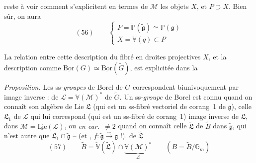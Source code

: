 \documentclass[11pt,a4paper]{article}
\begin{document}
 reste à voir comment s'explicitent en termes de $\mathcal{M}$ les
objets $X$, et $P \supset X$. Bien sûr, on aura
\[
  (56) \qquad \left\lbrace
  \begin{array}{l}
    P = \check{\mathbb{P}}(\widetilde{\mathfrak{g}}) \simeq \mathbb{P}(\mathfrak{g}) \\
    X = \mathbb{V}(q) \subset P
  \end{array}\right.
\]

La relation \struck{\ill{}} entre cette description du fibré en droites
projectives $X$, et la description comme $\underline{\mathrm{Bor}}(G) \simeq
\underline{\mathrm{Bor}}(\widetilde{G})$, est explicitée dans la

\emph{Proposition.} Les ss-\emph{groupes} de Borel  de $G$ correspondent
biunivoquement par image inverse  : 
 de $\mathcal{L} = \mathbb{V}(\mathcal{M})^{*}$ \ill{} 
de $\widetilde{G}$. Un ss-\emph{groupe} de Borel est connu quand on connaît son
algèbre de Lie $\mathfrak{L}$ (qui est un ss-fibré vectoriel de corang~1 de
$\mathfrak{g}$),  celle $\mathfrak{L}_1$ de $\mathcal{L}$ qui lui
correspond (qui est un ss-fibré   de corang~1)
image inverse de $\mathfrak{L}$, dans $\mathcal{M} = \underline{\mathrm{Lie}}(\mathcal{L})$,
 ou \emph{en car.\ $\neq 2$} quand on connaît celle
$\widetilde{\mathfrak{L}}$ de $\widetilde{B}$ dans $\widetilde{\mathfrak{g}}$, qui
n'est autre que $\mathfrak{L}_1 \cap \widetilde{\mathfrak{g}}$ -- (et \ill{} \ill{}
\ill{},  $f : \widetilde{\mathfrak{g}} \xrightarrow{\sim}
\mathfrak{g}$ !).   de $\widetilde{\mathfrak{L}}$
 
\[
  (57) \qquad \widetilde{B} = \check{\mathbb{V}}(\widetilde{\mathfrak{L}}) \cap
  \underbrace{\mathbb{V}(\mathcal{M})^{*}}_{\mathcal{L}}
  \qquad (B = \widetilde{B}/\mathbb{G}_m)
\]
\end{document}
